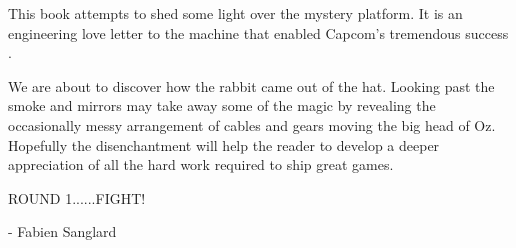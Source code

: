 This book attempts to shed some light over the mystery platform. It is an engineering love letter to the machine that enabled Capcom's tremendous success . 

We are about to discover how the rabbit came out of the hat. Looking past the smoke and mirrors may take away some of the magic by revealing the occasionally messy arrangement of cables and gears moving the big head of Oz. Hopefully the disenchantment will help the reader to develop a deeper appreciation of all the hard work required to ship great games.

ROUND 1......FIGHT!

- Fabien Sanglard